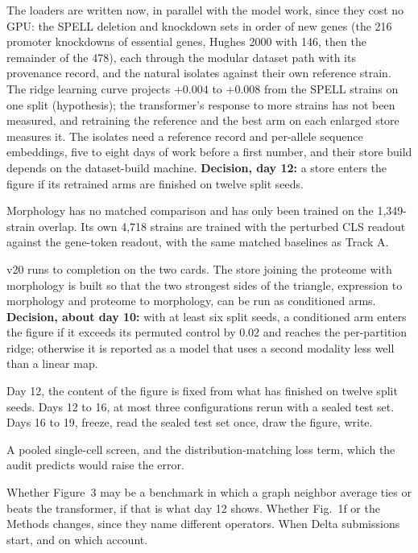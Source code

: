  The loaders are written now,
in parallel with the model work, since they cost no GPU: the SPELL deletion and knockdown
sets in order of new genes (the 216 promoter knockdowns of essential genes, Hughes 2000
with 146, then the remainder of the 478), each through the modular dataset path with its
provenance record, and the natural isolates against their own reference strain. The ridge
learning curve projects $+0.004$ to $+0.008$ from the SPELL strains on one split
(hypothesis); the transformer's response to more strains has not been measured, and
retraining the reference and the best arm on each enlarged store measures it. The isolates
need a reference record and per-allele sequence embeddings, five to eight days of work
before a first number, and their store build depends on the dataset-build machine.
\textbf{Decision, day 12:} a store enters the figure if its retrained arms are finished on
twelve split seeds.

 Morphology has no matched
comparison and has only been trained on the 1{,}349-strain overlap. Its own 4{,}718
strains are trained with the perturbed CLS readout against the gene-token readout, with the
same matched baselines as Track A.

 v20 runs to completion on the two 
cards. The store joining the proteome with morphology is built so that the two strongest
sides of the triangle, expression to morphology and proteome to morphology, can be run as
conditioned arms. \textbf{Decision, about day 10:} with at least six split seeds, a
conditioned arm enters the figure if it exceeds its permuted control by $0.02$ and reaches
the per-partition ridge; otherwise it is reported as a model that uses a second modality
less well than a linear map.

 Day 12, the content of the figure is fixed from what has finished
on twelve split seeds. Days 12 to 16, at most three configurations rerun with a sealed
test set. Days 16 to 19, freeze, read the sealed test set once, draw the figure, write.

 A pooled single-cell screen, and the distribution-matching loss
term, which the audit predicts would raise the error.

 Whether Figure~3 may be a benchmark in which a
graph neighbor average ties or beats the transformer, if that is what day 12 shows. Whether
Fig.~1f or the Methods changes, since they name different operators. When Delta
submissions start, and on which account.
